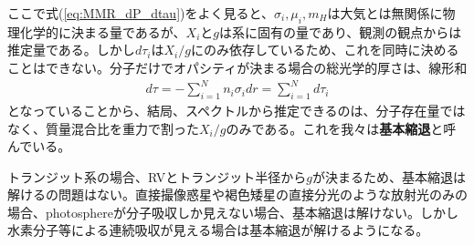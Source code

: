 ここで式(\ref{eq:MMR_dP_dtau})をよく見ると、$\sigma_i, \mu_i, m_H$は大気とは無関係に物理化学的に決まる量であるが、$X_i$と$g$は系に固有の量であり、観測の観点からは推定量である。しかし$d \tau_i$は$X_i/g$にのみ依存しているため、これを同時に決めることはできない。分子だけでオパシティが決まる場合の総光学的厚さは、線形和
\begin{align}
\label{eq:mol}
    d \tau = - \sum_{i=1}^N n_i \sigma_i dr = \sum_{i=1}^N d \tau_i
\end{align}
となっていることから、結局、スペクトルから推定できるのは、分子存在量ではなく、質量混合比を重力で割った$X_i/g$のみである。これを我々は{\bf 基本縮退}と呼んでいる。


トランジット系の場合、RVとトランジット半径から$g$が決まるため、基本縮退は解けるの問題はない。直接撮像惑星や褐色矮星の直接分光のような放射光のみの場合、photosphereが分子吸収しか見えない場合、基本縮退は解けない。しかし水素分子等による連続吸収が見える場合は基本縮退が解けるようになる\cite{2025ApJ...988...53K}。
